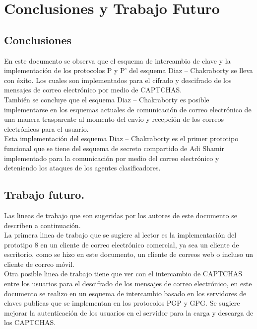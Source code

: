 \documentclass[12pt,oneside,onecolumn,openany]{report}
\begin{document}
\chapter{Conclusiones y Trabajo Futuro}
\section{Conclusiones}

En este documento se observa que el esquema de intercambio de clave y la implementación de los protocolos P y P’ del esquema Diaz – Chakraborty se lleva con éxito. Los cuales son implementados para el cifrado y descifrado de los mensajes de correo electrónico por medio de CAPTCHAS. \\

También se concluye que el esquema Diaz – Chakraborty es posible implementarse en los esquemas actuales de comunicación de correo electrónico de una manera trasparente al momento del envío y recepción de los correos electrónicos para el usuario.\\

Esta implementación del esquema Diaz – Chakraborty es el primer prototipo funcional que se tiene del esquema de secreto compartido de Adi Shamir implementado para la comunicación por medio del correo electrónico y deteniendo los ataques de los agentes clasificadores.\\

\section{Trabajo futuro.}

Las lineas de trabajo que son sugeridas por los autores de este documento se describen a continuación.\\

La primera linea de trabajo que se sugiere al lector es la implementación del prototipo 8 en un cliente de correo electrónico comercial, ya sea un cliente de escritorio, como se hizo en este documento, un cliente de correos web o incluso un cliente de correo móvil.\\

Otra posible linea de trabajo tiene que ver con el intercambio de CAPTCHAS entre los usuarios para el descifrado de los mensajes de correo electrónico, en este documento se realizo en un esquema de intercambio basado en los servidores de claves publicas que se implementan en los protocolos PGP y GPG. Se sugiere mejorar la autenticación  de los usuarios en el servidor para la carga y descarga de los CAPTCHAS.\\
\end{document}
